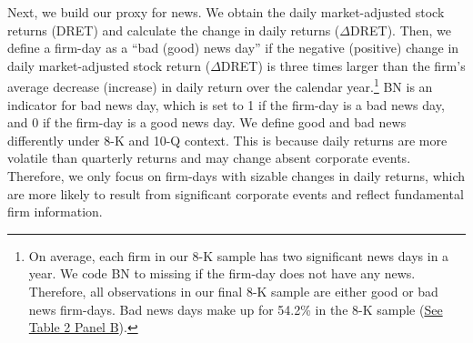 \documentclass[letterpaper,12pt]{article}
\begin{document}
\begin{spacing}{1.5}
Next, we build our proxy for news. We obtain the daily market-adjusted stock returns (DRET) and calculate the change in daily returns ($\Delta$DRET). Then, we define a firm-day as a ``bad (good) news day” if the negative (positive) change in daily market-adjusted stock return ($\Delta$DRET) is three times larger than the firm's average decrease (increase) in daily return over the calendar year.\footnote{On average, each firm in our 8-K sample has two significant news days in a year. We code BN to missing if the firm-day does not have any news. Therefore, all observations in our final 8-K sample are either good or bad news firm-days. Bad news days make up for 54.2\% in the 8-K sample (\hyperref[T2PB]{See Table 2 Panel B}).} BN is an indicator for bad news day, which is set to 1 if the firm-day is a bad news day, and 0 if the firm-day is a good news day. We define good and bad news differently under 8-K and 10-Q context. This is because daily returns are more volatile than quarterly returns and may change absent corporate events. Therefore, we only focus on firm-days with sizable changes in daily returns, which are more likely to result from significant corporate events and reflect fundamental firm information.


\end{spacing}
\end{document}
